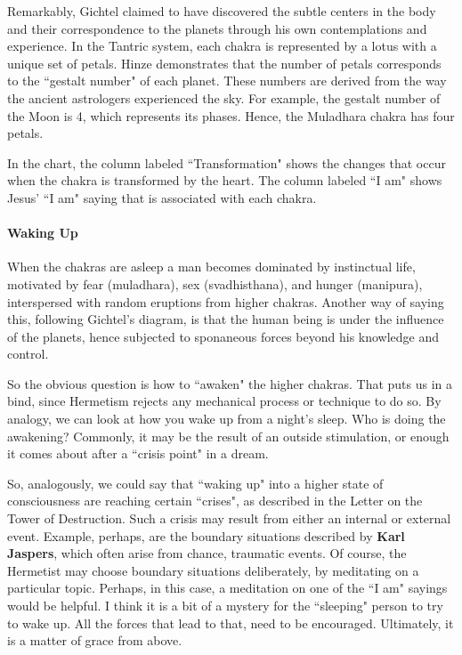 Remarkably, Gichtel claimed to have discovered the subtle centers in the body and their correspondence to the planets through his own contemplations and experience. In the Tantric system, each chakra is represented by a lotus with a unique set of petals. Hinze demonstrates that the number of petals corresponds to the ``gestalt number" of each planet. These numbers are derived from the way the ancient astrologers experienced the sky. For example, the gestalt number of the Moon is 4, which represents its phases. Hence, the Muladhara chakra has four petals.

In the chart, the column labeled ``Transformation" shows the changes that occur when the chakra is transformed by the heart. The column labeled ``I am" shows Jesus’ ``I am" saying that is associated with each chakra.

\paragraph{Waking Up}
When the chakras are asleep a man becomes dominated by instinctual life, motivated by fear (muladhara), sex (svadhisthana), and hunger (manipura), interspersed with random eruptions from higher chakras. Another way of saying this, following Gichtel's diagram, is that the human being is under the influence of the planets, hence subjected to sponaneous forces beyond his knowledge and control.

So the obvious question is how to ``awaken" the higher chakras. That puts us in a bind, since Hermetism rejects any mechanical process or technique to do so. By analogy, we can look at how you wake up from a night's sleep. Who is doing the awakening? Commonly, it may be the result of an outside stimulation, or enough it comes about after a ``crisis point" in a dream.

So, analogously, we could say that ``waking up" into a higher state of consciousness are reaching certain ``crises", as described in the Letter on the Tower of Destruction. Such a crisis may result from either an internal or external event. Example, perhaps, are the boundary situations described by \textbf{Karl Jaspers}, which often arise from chance, traumatic events. Of course, the Hermetist may choose boundary situations deliberately, by meditating on a particular topic. Perhaps, in this case, a meditation on one of the ``I am" sayings would be helpful. I think it is a bit of a mystery for the ``sleeping" person to try to wake up. All the forces that lead to that, need to be encouraged. Ultimately, it is a matter of grace from above.

